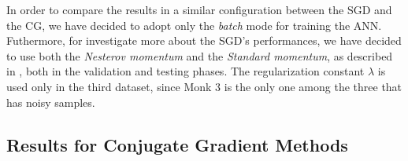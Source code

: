             In order to compare the results in a similar configuration between the SGD and the CG, we have decided to
            adopt only the \textit{batch} mode for training the ANN.
            Futhermore, for investigate more about the SGD's performances, we have decided to use both the
            \textit{Nesterov momentum} and the \textit{Standard momentum}, as described in
            \cite{Goodfellow-et-al-2016,Sutskever:2013:IIM:3042817.3043064}, both in the validation and testing phases.
            The regularization constant $\lambda$ is used only in the third dataset, since Monk 3 is the only one among
            the three that has noisy samples.



        \subsection{Results for Conjugate Gradient Methods} %
        \label{sub:results_for_conjugate_gradient_method}

